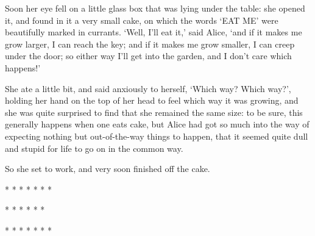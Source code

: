 \documentclass{article}
\begin{document}
Soon her eye fell on a little glass box that was lying under the table: she opened it, and found in it a very small cake, on which the words `EAT ME' were beautifully marked in currants. `Well, I'll eat it,' said Alice, `and if it makes me grow larger, I can reach the key; and if it makes me grow smaller, I can creep under the door; so either way I'll get into the garden, and I don't care which happens!'

She ate a little bit, and said anxiously to herself, `Which way? Which way?', holding her hand on the top of her head to feel which way it was growing, and she was quite surprised to find that she remained the same size: to be sure, this generally happens when one eats cake, but Alice had got so much into the way of expecting nothing but out-of-the-way things to happen, that it seemed quite dull and stupid for life to go on in the common way.

So she set to work, and very soon finished off the cake.

     *       *       *       *       *       *       *

         *       *       *       *       *       *

     *       *       *       *       *       *       *
\end{document}

